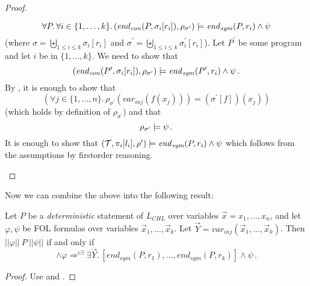 \begin{proof}
\begin{enumerate}
            \begin{equation*}
                \forall P.\, \forall i \in \{ 1, \ldots, k \} . \,
                (\mathit{end}_{\mathit{con}}(P, \sigma_i[r_i]), \rho_{\sigma^\prime})
                \models \mathit{end}_{\mathit{sym}}(P, r_i) \land \psi
            \end{equation*}
            (where $\sigma = \biguplus_{1 \leq i \leq k} \sigma_i[r_i]$
            and $\sigma^\prime = \biguplus_{1 \leq i \leq k} \sigma^\prime_i[r_i]$).
            Let $P^\prime$ be some program and let $i$ be in $\{ 1, \ldots, k \}$.
            We need to show that 
            \begin{equation*}
                (\mathit{end}_{\mathit{con}}(P^\prime, \sigma_i[r_i]), \rho_{\sigma^\prime})
                \models \mathit{end}_{\mathit{sym}}(P^\prime, r_i) \land \psi \, .
            \end{equation*}
            By , it is enough to show that
            \begin{equation*}
                (\forall j \in \{ 1, \ldots, n \}.\, \rho_{\sigma^\prime}(\mathit{var}_{\mathit{inj}}(f(x_j))) = (\sigma^\prime[f])(x_j))
            \end{equation*}
            (which holds by definition of $\rho_{\sigma^\prime}$) and that
            \begin{equation*}
                \rho_{\sigma^\prime} \models \psi \, .
            \end{equation*}
            It is enough to show that
            $(\mathcal{T}, \pi_i[l_i], \rho^\prime) \models \mathit{end}_{\mathit{sym}}(P, r_i) \land \psi$
            which follows from the assumptions by firstorder reasoning.
    \end{enumerate}

\end{proof}

    Now we can combine the above into the following result:

    \begin{theorem}\label{thm:chlOPCRLrelation}
        Let $P$ be a \emph{deterministic} statement of $L_{\mathit{CHL}}$ over variables $\vec{x} = x_1,\ldots,x_n$,
        and let $\varphi,\psi$ be FOL formulas over variables
        $\vec{x}_1,\ldots,\vec{x}_k$.
        Let $\vec{Y} = \mathit{var}_{\mathit{inj}}(\vec{x}_1, \ldots, \vec{x}_k)$.
        Then $||\varphi||\ P\ ||\psi||$ if and only if
        \begin{equation*}
            [\mathit{tr}_{\mathit{sym}}(P, r_1),\ldots,\mathit{tr}_{\mathit{sym}}(P, r_k)] \land \varphi
            \Rightarrow^{c\exists} \exists \vec{Y}.\, [\mathit{end}_{\mathit{sym}}(P, r_1),\ldots,\mathit{end}_{\mathit{sym}}(P, r_k)] \land \psi \, .
        \end{equation*}
    \end{theorem}
    \begin{proof}
        Use  and .
    \end{proof}


